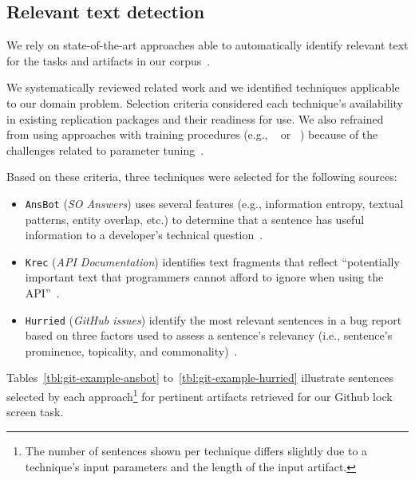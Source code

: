 




\subsection{Relevant text detection}
\label{cp4:corpus-relevant-text}




 
We rely on state-of-the-art approaches able to automatically identify relevant text for the tasks and artifacts in our corpus~\cite{nadi2020, Robillard2015, Lotufo2012, Xu2017}.


We systematically reviewed related work and we identified techniques applicable to our domain problem. Selection criteria considered each technique's availability in existing replication packages and their readiness for use.
We also refrained from using approaches with training procedures (e.g., ~\cite{liu2020} or ~\cite{Treude2016}) because of the challenges related to parameter tuning~\cite{Chaparro2017, fucci2019}.



Based on these criteria, three techniques were selected for the following sources:


\begin{itemize}[leftmargin=\parindent, font=\normalfont\itshape]
    \item \texttt{\acs{AnsBot}} (\textit{SO Answers}) uses several features (e.g., information entropy, textual patterns, entity overlap, etc.) to determine that a sentence has useful information to a developer's technical question~\cite{Xu2017}.
    
    \item \texttt{\acs{Krec}} (\textit{API Documentation}) identifies text fragments that reflect ``potentially important text that programmers cannot afford to ignore when using the API''~\cite{Robillard2015}.
    
    \item \texttt{\acs{Hurried}} (\textit{GitHub issues}) identify the most relevant sentences in a bug report based on three factors used to assess a sentence's relevancy (i.e., sentence's prominence, topicality, and commonality)~\cite{Lotufo2012}.
\end{itemize}


Tables~\ref{tbl:git-example-ansbot} to~\ref{tbl:git-example-hurried}
illustrate sentences selected by each approach\footnote{The number of sentences shown per technique
differs slightly due to a technique's input parameters and the length of the input artifact.}
 for pertinent artifacts retrieved for our Github lock screen task. 


